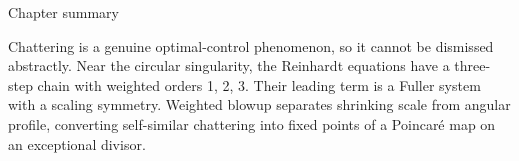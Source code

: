 \begin{insightbox}{Chapter summary}
\end{insightbox}

Chattering is a genuine optimal-control phenomenon, so it cannot be dismissed abstractly. Near the circular singularity, the Reinhardt equations have a three-step chain with weighted orders 1, 2, 3. Their leading term is a Fuller system with a scaling symmetry. Weighted blowup separates shrinking scale from angular profile, converting self-similar chattering into fixed points of a Poincaré map on an exceptional divisor.

